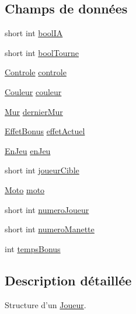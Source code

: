 \subsection*{Champs de données}
\begin{DoxyCompactItemize}
\item 
short int \hyperlink{structJoueur_a2294a826a87221de10ee4aa493598493}{bool\-I\-A}
\item 
short int \hyperlink{structJoueur_a439aff6381e9272c2fbb737dfa2362bc}{bool\-Tourne}
\item 
\hyperlink{structControle}{Controle} \hyperlink{structJoueur_a9e673b161d97d9530f7ff108d5ea8b52}{controle}
\item 
\hyperlink{Couleur_8h_aa304d0ca681f782b1d7735da33037dd7}{Couleur} \hyperlink{structJoueur_a966bbda4413e0b0d7aaf109660926639}{couleur}
\item 
\hyperlink{structMur}{Mur} \hyperlink{structJoueur_a48e6e118639e1b7f8718b0e8abb93016}{dernier\-Mur}
\item 
\hyperlink{EffetBonus_8h_a5c3ffd6a343fb8d5f63c87ee1a37a7fe}{Effet\-Bonus} \hyperlink{structJoueur_aba2ad8c2cbba6a62b7f30c76373f8b4e}{effet\-Actuel}
\item 
\hyperlink{Joueur_8h_a43a9f41708ce5d7ddf49e05d61f48c3b}{En\-Jeu} \hyperlink{structJoueur_a83e062c54d98b446e0bb30a93d23f2fd}{en\-Jeu}
\item 
short int \hyperlink{structJoueur_a7672ceecb63c257cf2d9a659662620fc}{joueur\-Cible}
\item 
\hyperlink{structMoto}{Moto} \hyperlink{structJoueur_ac2768294956259e01d0744d6db789fe2}{moto}
\item 
short int \hyperlink{structJoueur_a16d5323b40b813198386623075de9fa1}{numero\-Joueur}
\item 
short int \hyperlink{structJoueur_aab4fb5652b29a6bdfc5dff4ed4dbe8da}{numero\-Manette}
\item 
int \hyperlink{structJoueur_a924a294aef342302f978bc900cfdb98a}{temps\-Bonus}
\end{DoxyCompactItemize}


\subsection{Description détaillée}
Structure d'un \hyperlink{structJoueur}{Joueur}. 

